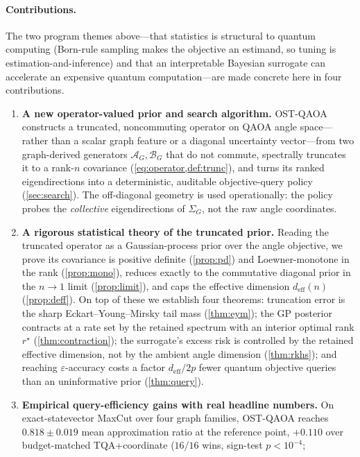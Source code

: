 \documentclass[aps,prxquantum,reprint,amsmath,amssymb,floatfix,nofootinbib,superscriptaddress,longbibliography]{revtex4-2}
\theoremstyle{remark}
\newcommand{\OSTQAOA}{\textnormal{\textsc{OST-QAOA}}}
\newcommand{\TQA}{\textnormal{\textsc{TQA}}}
\newcommand{\calA}{\mathcal{A}}
\newcommand{\calB}{\mathcal{B}}
\begin{document}
\paragraph{Contributions.}  The two program themes above---that statistics is
structural to quantum computing (Born-rule sampling makes the objective an
estimand, so tuning is estimation-and-inference) and that an interpretable
Bayesian surrogate can accelerate an expensive quantum computation---are made
concrete here in four contributions.
\begin{enumerate}
\item \textbf{A new operator-valued prior and search algorithm.}  \OSTQAOA{}
constructs a truncated, noncommuting operator on QAOA angle space---rather than a
scalar graph feature or a diagonal uncertainty vector---from two graph-derived
generators \(\calA_G,\calB_G\) that do not commute, spectrally truncates it to a
rank-\(n\) covariance (\cref{eq:operator,def:trunc}), and turns its ranked
eigendirections into a deterministic, auditable objective-query policy
(\cref{sec:search}).  The off-diagonal geometry is used operationally: the policy
probes the \emph{collective} eigendirections of \(\Sigma_G\), not the raw angle
coordinates.
\item \textbf{A rigorous statistical theory of the truncated prior.}  Reading the
truncated operator as a Gaussian-process prior over the angle objective, we prove
its covariance is positive definite (\cref{prop:pd}) and Loewner-monotone in the
rank (\cref{prop:mono}), reduces exactly to the commutative diagonal prior in the
\(n\to1\) limit (\cref{prop:limit}), and caps the effective dimension
\(d_{\mathrm{eff}}(n)\) (\cref{prop:deff}).  On top of these we establish four
theorems: truncation error is the sharp Eckart--Young--Mirsky tail mass
(\cref{thm:eym}); the GP posterior contracts at a rate set by the retained
spectrum with an interior optimal rank \(r^{\star}\) (\cref{thm:contraction}); the
surrogate's excess risk is controlled by the retained effective dimension, not by
the ambient angle dimension (\cref{thm:rkhs}); and reaching \(\varepsilon\)-accuracy
costs a factor \(d_{\mathrm{eff}}/2p\) fewer quantum objective queries than an
uninformative prior (\cref{thm:query}).
\item \textbf{Empirical query-efficiency gains with real headline numbers.}  On
exact-statevector MaxCut over four graph families, \OSTQAOA{} reaches
\(0.818\pm0.019\) mean approximation ratio at the reference point, \(+0.110\) over
budget-matched \TQA{}+coordinate (\(16/16\) wins, sign-test \(p<10^{-4}\);

\end{enumerate}
\end{document}
